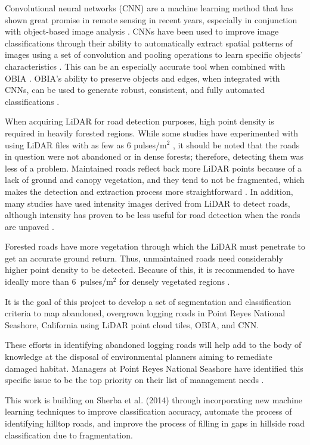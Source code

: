\documentclass[remotesensing,article,accept,pdftex,moreauthors]{Definitions/mdpi}
\begin{document}
Convolutional neural networks (CNN) are a machine learning method that has shown great promise in remote sensing in recent years, especially in conjunction with object-based image analysis \cite{ferreira}. CNNs have been used to improve image classifications through their ability to automatically extract spatial patterns of images using a set of convolution and pooling operations to learn specific objects’ characteristics \cite{zhang}. This can be an especially accurate tool when combined with OBIA \cite{martins}. OBIA’s ability to preserve objects and edges, when integrated with CNNs, can be used to generate robust, consistent, and fully automated classifications \cite{robson}.

When acquiring LiDAR for road detection purposes, high point density is required in heavily forested regions. While some studies have experimented with using LiDAR files with as few as 6 pulses/m$^2$ \cite{white}, it should be noted that the roads in question were not abandoned or in dense forests; therefore, detecting them was less of a problem. Maintained roads reflect back more LiDAR points because of a lack of ground and canopy vegetation, and they tend to not be fragmented, which makes the detection and extraction process more straightforward \cite{li}. In addition, many studies have used intensity images derived from LiDAR to detect roads, although intensity has proven to be less useful for road detection when the roads are unpaved \cite{yong, white}.  

Forested roads have more vegetation through which the LiDAR must penetrate to get an accurate ground return. Thus, unmaintained roads need considerably higher point density to be detected. Because of this, it is recommended to have ideally more than 6~pulses/m$^2$ for densely vegetated regions \cite{sherba}. 

It is the goal of this project to develop a set of segmentation and classification criteria to map abandoned, overgrown logging roads in Point Reyes National Seashore, California using LiDAR point cloud tiles, OBIA, and CNN. 

These efforts in identifying abandoned logging roads will help add to the body of knowledge at the disposal of environmental planners aiming to remediate damaged habitat. Managers at Point Reyes National Seashore have identified this specific issue to be the top   priority on their list of management needs \cite{becker}.

This work is building on Sherba et al. (2014) \cite{sherba} through incorporating new machine learning techniques to improve classification accuracy, automate the process of identifying hilltop roads, and improve the process of filling in gaps in hillside road classification due to fragmentation.
\end{document}
